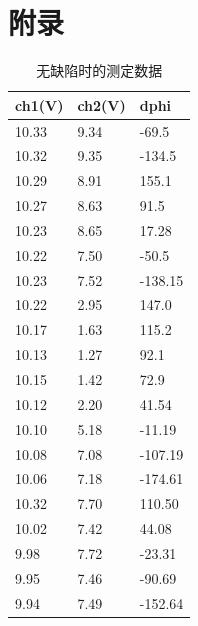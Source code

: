 \documentclass[fleqn,10pt]{SelfArx} %
\begin{document}



\clearpage
\appendix
\section{附录}
\renewcommand{\thetable}{附表\arabic{table}}
\setcounter{table}{0}

\begin{table}[h]
	\centering
	\begin{tabular}{|l|l|l|}
	\hline
	ch1(V) & ch2(V) & dphi    \\ \hline
	10.33  & 9.34   & -69.5   \\ \hline
	10.32  & 9.35   & -134.5  \\ \hline
	10.29  & 8.91   & 155.1   \\ \hline
	10.27  & 8.63   & 91.5    \\ \hline
	10.23  & 8.65   & 17.28   \\ \hline
	10.22  & 7.50   & -50.5   \\ \hline
	10.23  & 7.52   & -138.15 \\ \hline
	10.22  & 2.95   & 147.0   \\ \hline
	10.17  & 1.63   & 115.2   \\ \hline
	10.13  & 1.27   & 92.1    \\ \hline
	10.15  & 1.42   & 72.9    \\ \hline
	10.12  & 2.20   & 41.54   \\ \hline
	10.10  & 5.18   & -11.19  \\ \hline
	10.08  & 7.08   & -107.19 \\ \hline
	10.06  & 7.18   & -174.61 \\ \hline
	10.32  & 7.70   & 110.50  \\ \hline
	10.02  & 7.42   & 44.08   \\ \hline
	9.98   & 7.72   & -23.31  \\ \hline
	9.95   & 7.46   & -90.69  \\ \hline
	9.94   & 7.49   & -152.64 \\ \hline
	\end{tabular}
	\caption{无缺陷时的测定数据}
	\label{tab:app1}
\end{table}
\end{document}
